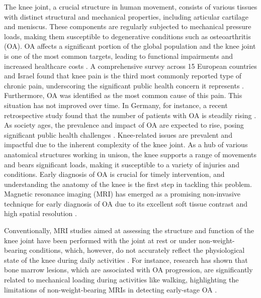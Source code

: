 \documentclass{micro-econ-thesis}
\begin{document}
The knee joint, a crucial structure in human movement, consists of various tissues with distinct structural and mechanical properties, including articular cartilage and meniscus. These components are regularly subjected to mechanical pressure loads, making them susceptible to degenerative conditions such as osteoarthritis (OA). OA affects a significant portion of the global population and the knee joint is one of the most common targets, leading to functional impairments and increased healthcare costs \parencite{WHO}. A comprehensive survey across 15 European countries and Israel found that knee pain is the third most commonly reported type of chronic pain, underscoring the significant public health concern it represents \parencite{breivik_survey_2006}. Furthermore, OA was identified as the most common cause of this pain. This situation has not improved over time. In Germany, for instance, a recent retrospective study found that the number of patients with OA is steadily rising \parencite{obermuller_epidemiology_2024}. As society ages, the prevalence and impact of OA are expected to rise, posing significant public health challenges \parencite{yelin_burden_2016}. Knee-related issues are prevalent and impactful due to the inherent complexity of the knee joint. As a hub of various anatomical structures working in unison, the knee supports a range of movements and bears significant loads, making it susceptible to a variety of injuries and conditions. Early diagnosis of OA is crucial for timely intervention, and understanding the anatomy of the knee is the first step in tackling this problem. Magnetic resonance imaging (MRI) has emerged as a promising non-invasive technique for early diagnosis of OA due to its excellent soft tissue contrast and high spatial resolution \parencite{kijowski_osteoarthritis_2020}. 

Conventionally, MRI studies aimed at assessing the structure and function of the knee joint have been performed with the joint at rest or under non-weight-bearing conditions, which, however, do not accurately reflect the physiological state of the knee during daily activities \parencite{blankevoort_envelope_1988}. For instance, research has shown that bone marrow lesions, which are associated with OA progression, are significantly related to mechanical loading during activities like walking, highlighting the limitations of non-weight-bearing MRIs in detecting early-stage OA \parencite{bennell_bone_2010}. 
\end{document}
